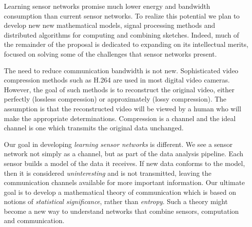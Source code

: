 Learning sensor networks promise much lower energy and bandwidth
consumption than current sensor networks. To realize this potential we
plan to develop new new mathematical models, signal processing methods
and distributed algorithms for computing and combining sketches. Indeed, much of the remainder of the proposal is dedicated to expanding on its intellectual merits, focused on solving some of the challenges that sensor networks present.
\fi

The need to reduce communication bandwidth is not new. Sophisticated video compression methods such as H.264 are used in most digital video cameras. However, the goal of such methods is to reconstruct the original video, either perfectly (lossless compression) or approximately (lossy compression). The assumption is that the reconstructed video will be viewed by a human who will make the appropriate determinations. Compression is a channel and the ideal channel is one which transmits the original data unchanged.

Our goal in developing {\em learning sensor networks} is different. We see a sensor network not simply as a channel, but as part of the data analysis pipeline. Each sensor builds a model of the data it receives. If new data conforms to the model, then it is considered {\em uninteresting} and is not transmitted, leaving the communication channels available for more important information. Our ultimate goal is to develop a mathematical theory of communication which is based on notions of {\em statistical significance}, rather than {\em entropy}. Such a theory might become a new way to understand networks that combine sensors, computation and communication.


